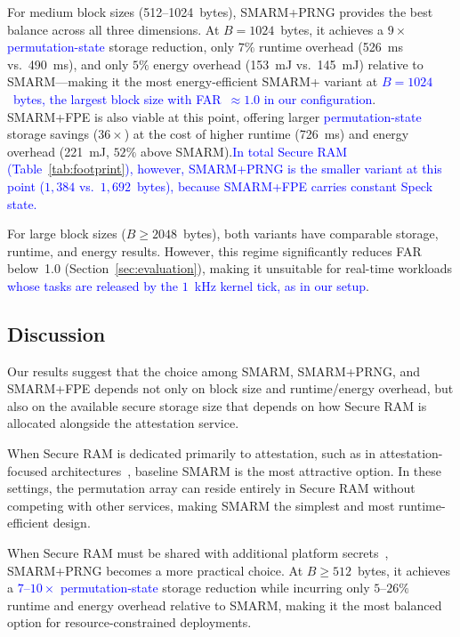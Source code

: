 \documentclass[journal]{IEEEtran}
\newcommand\ben[1]{\textcolor{blue}{#1}}
\newcommand{\rtsmarm}{SMARM+\xspace}
\newcommand{\rtsmarmone}{SMARM+PRNG\xspace}
\newcommand{\rtsmarmtwo}{SMARM+FPE\xspace}
\begin{document}
For medium block sizes (512--1024~bytes), \rtsmarmone 
provides the best balance across all three dimensions. 
At $B = 1024$~bytes, it achieves a $9\times$ \ben{permutation-state} storage reduction, only $7\%$ runtime overhead (526~ms vs.\ 
490~ms), and only $5\%$ energy overhead (153~mJ vs.\ 
145~mJ) relative to SMARM---making it the most 
energy-efficient \rtsmarm variant at \ben{$B = 1024$~bytes, the largest block size with FAR~$\approx 1.0$ in our configuration}.
\rtsmarmtwo is also viable at this point, offering larger 
\ben{permutation-state} storage savings ($36\times$) at the cost of higher runtime (726~ms) and energy overhead (221~mJ, $52\%$ above SMARM).\ben{In total Secure RAM (Table~\ref{tab:footprint}), however, \rtsmarmone is the smaller variant at this point ($1{,}384$ vs.\ $1{,}692$~bytes), because \rtsmarmtwo carries constant Speck state.}


For large block sizes ($B \geq 2048$~bytes), both variants 
have comparable storage, runtime, and energy results. 
However, this regime significantly reduces FAR 
below~1.0 (Section~\ref{sec:evaluation}), making it 
unsuitable for real-time workloads\ben{ whose tasks are released by the $1$~kHz kernel tick, as in our setup}.



\subsection{Discussion}
\label{sec:resmarm-discussion}

Our results suggest that the choice among SMARM, \rtsmarmone, and \rtsmarmtwo depends not only on block size and runtime/energy overhead, but also on the available secure storage size that depends on how Secure RAM is allocated alongside the attestation service.

When Secure RAM is dedicated primarily to attestation, such as in attestation-focused architectures~\cite{smart,hydra}, baseline SMARM is the most attractive option.
In these settings, the permutation array can reside entirely in Secure RAM without competing with other services, making SMARM the simplest and most runtime-efficient design.


When Secure RAM must be shared with additional platform 
secrets~\cite{silabs-secure-key-storage}, \rtsmarmone 
becomes a more practical choice. At $B \geq 512$~bytes, 
it achieves a \ben{$7$--$10\times$ permutation-state} storage reduction while incurring only $5$--$26\%$ runtime and energy overhead relative to 
SMARM, making it the most balanced option for 
resource-constrained deployments.
\end{document}
